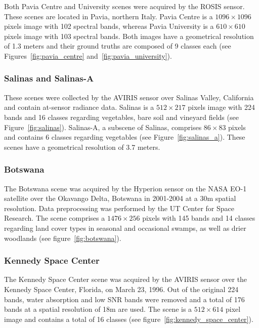 \documentclass[parskip=full]{scrartcl}
\begin{document}
Both Pavia Centre and University scenes were acquired by the ROSIS sensor. These scenes are located
in Pavia, northern Italy. Pavia Centre is a $1096 \times 1096$ pixels image with 102 spectral bands,
whereas Pavia University is a $610 \times 610$ pixels image with 103 spectral bands.  Both images
have a geometrical resolution of 1.3 meters and their ground truths are composed of 9 classes each
(see Figures~\ref{fig:pavia_centre} and~\ref{fig:pavia_university}).

\subsubsection*{Salinas and Salinas-A}

These scenes were collected by the AVIRIS sensor over Salinas Valley, California and contain
at-sensor radiance data. Salinas is a $512 \times 217$ pixels image with 224 bands and 16 classes
regarding vegetables, bare soil and vineyard fields (see Figure~\ref{fig:salinas}). Salinas-A, a
subscene of Salinas, comprises $86 \times 83$ pixels and contains 6 classes regarding vegetables
(see Figure~\ref{fig:salinas_a}). These scenes have a geometrical resolution of 3.7 meters.

\subsubsection*{Botswana}

The Botswana scene was acquired by the Hyperion sensor on the NASA EO-1 satellite over the Okavango
Delta, Botswana in 2001-2004 at a 30m spatial resolution. Data preprocessing was performed by the UT
Center for Space Research. The scene comprises a $1476 \times 256$ pixels with 145 bands and 14
classes regarding land cover types in seasonal and occasional swamps, as well as drier woodlands
(see figure~\ref{fig:botswana}).

\subsubsection*{Kennedy Space Center}

The Kennedy Space Center scene was acquired by the AVIRIS sensor over the Kennedy Space Center,
Florida, on March 23, 1996. Out of the original 224 bands, water absorption and low SNR bands were
removed and a total of 176 bands at a spatial resolution of 18m are used. The scene is a $512 \times
614$ pixel image and contains a total of 16 classes (see figure~\ref{fig:kennedy_space_center}).
\end{document}
